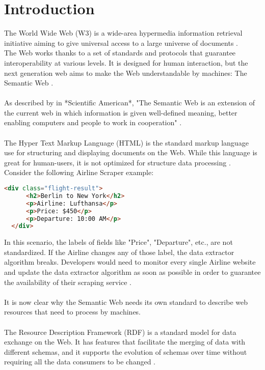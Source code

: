\chapter{Introduction\label{cha:chapter1}}

The World Wide Web (W3) is a wide-area hypermedia information retrieval initiative aiming to give universal access to a large universe of documents \cite{www}.
\\
The Web works thanks to a set of standards and protocols that guarantee interoperability at various levels. 
It is designed for human interaction, but the next generation web aims to make the Web understandable by machines: The Semantic Web \cite{sematicWeb}.
\\
\\
As described by in *Scientific American*, "The Semantic Web is an extension of the current web in which information is given well-defined meaning, better enabling computers and people to work in cooperation" \cite{bernerslee2001semantic}.
\\
\\
The Hyper Text Markup Language (HTML) is the standard markup language use for structuring and displaying documents on the Web.
While this language is great for human-users, it is not optimized for structure data processing \cite{herman2003semanticweb}. 
\\
Consider the following Airline Scraper example:
\begin{lstlisting}[language=HTML, caption={Example of HTML flight data from a Airline company}, label={lst:html-example}]
  <div class="flight-result">
      <h2>Berlin to New York</h2>
      <p>Airline: Lufthansa</p>
      <p>Price: $450</p>
      <p>Departure: 10:00 AM</p>
  </div>
  \end{lstlisting}
In this scenario, the labels of fields like "Price", "Departure", etc., are not standardized. If the Airline changes any of those label, the data extractor algorithm breaks. 
Developers would need to monitor every single Airline website and update the data extractor algorithm as soon as possible in order to guarantee the availability of their scraping service \cite{herman2003semanticweb}.
\\
\\
It is now clear why the Semantic Web needs its own standard to describe web resources that need to process by machines.
\\
\\
The Resource Description Framework (RDF) is a standard model for data exchange on the Web. It has features that facilitate the merging of data with different schemas, and it supports the evolution of schemas over time without requiring all the data consumers to be changed \cite{rdf}.
